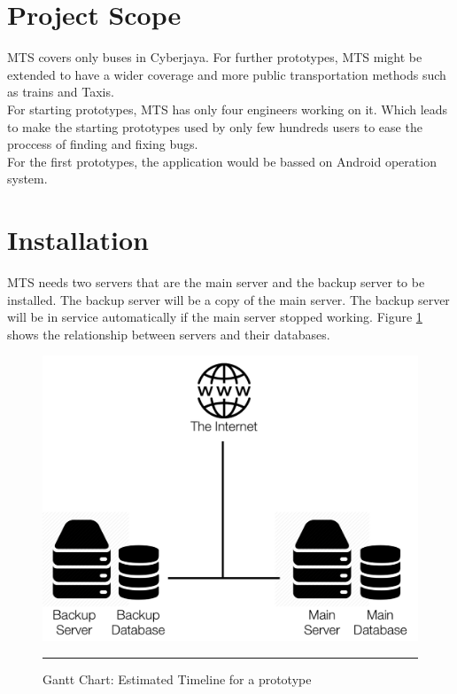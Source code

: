 \pagebreak
\section{Project Scope}
MTS covers only buses in Cyberjaya. For further prototypes, MTS might be extended to have a wider coverage and more public transportation methods such as trains and Taxis.\\

For starting prototypes, MTS has only four engineers working on it. Which leads to make the starting prototypes used by only few hundreds users to ease the proccess of finding and fixing bugs.\\

For the first prototypes, the application would be bassed on Android operation system. \\

\section{Installation}
MTS needs two servers that are the main server and the backup server to be installed. The backup server will be a copy of the main server. The backup server will be in service automatically if the main server stopped working. Figure \ref{fig:ServerArch} shows the relationship between servers and their databases.

\begin{figure}[H]
	\centering
	\includegraphics[scale=0.55]{Figures/FigureInstallation.png}
	\rule{35em}{0.5pt}
	\caption[Gantt Chart: Estimated Timeline for a prototype]{Gantt Chart: Estimated Timeline for a prototype}
	\label{fig:ServerArch}
\end{figure}

